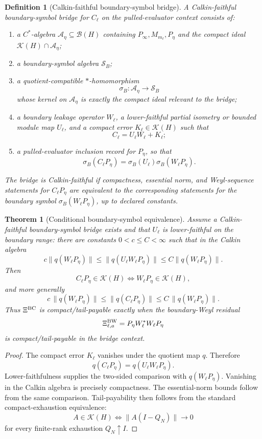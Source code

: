 \documentclass[11pt]{article}
\newtheorem{theorem}{Theorem}
\newtheorem{definition}{Definition}
\begin{document}
\begin{definition}[Calkin-faithful boundary-symbol bridge]
A Calkin-faithful boundary-symbol bridge for \(C_\ell\) on the pulled-evaluator
context consists of:
\begin{enumerate}[label=(\roman*)]
\item a \(C^*\)-algebra \(\mathcal A_\eta\subseteq\mathcal B(H)\) containing
\(P_\infty,M_{m_\ell},P_\eta\) and the compact ideal \(\mathcal K(H)\cap\mathcal A_\eta\);
\item a boundary-symbol algebra \(\mathcal S_B\);
\item a quotient-compatible \(*\)-homomorphism
\[
\sigma_B:\mathcal A_\eta\to\mathcal S_B
\]
whose kernel on \(\mathcal A_\eta\) is exactly the compact ideal relevant to the
bridge;
\item a boundary leakage operator \(W_\ell\), a lower-faithful partial isometry or
bounded module map \(U_\ell\), and a compact error \(K_\ell\in\mathcal K(H)\) such that
\[
C_\ell=U_\ell W_\ell+K_\ell;
\]
\item a pulled-evaluator inclusion record for \(P_\eta\), so that
\[
\sigma_B(C_\ell P_\eta)=\sigma_B(U_\ell)\sigma_B(W_\ell P_\eta).
\]
\end{enumerate}
The bridge is \emph{Calkin-faithful} if compactness, essential norm, and
Weyl-sequence statements for \(C_\ell P_\eta\) are equivalent to the corresponding
statements for the boundary symbol \(\sigma_B(W_\ell P_\eta)\), up to declared
constants.
\end{definition}

\begin{theorem}[Conditional boundary-symbol equivalence]
Assume a Calkin-faithful boundary-symbol bridge exists and that \(U_\ell\) is
lower-faithful on the boundary range: there are constants \(0<c\le C<\infty\)
such that in the Calkin algebra
\[
c\|q(W_\ell P_\eta)\|\le \|q(U_\ell W_\ell P_\eta)\|
\le C\|q(W_\ell P_\eta)\|.
\]
Then
\[
C_\ell P_\eta\in\mathcal K(H)
\iff
W_\ell P_\eta\in\mathcal K(H),
\]
and more generally
\[
c\,\|q(W_\ell P_\eta)\|
\le
\|q(C_\ell P_\eta)\|
\le
C\,\|q(W_\ell P_\eta)\|.
\]
Thus \(\Xi^{\rm BC}\) is compact/tail-payable exactly when the boundary-Weyl
residual
\[
\Xi^{\rm BW}_{\ell,a}=P_\eta W_\ell^*W_\ell P_\eta
\]
is compact/tail-payable in the bridge context.
\end{theorem}

\begin{proof}
The compact error \(K_\ell\) vanishes under the quotient map \(q\).  Therefore
\[
q(C_\ell P_\eta)=q(U_\ell W_\ell P_\eta).
\]
Lower-faithfulness supplies the two-sided comparison with \(q(W_\ell P_\eta)\).
Vanishing in the Calkin algebra is precisely compactness.  The essential-norm
bounds follow from the same comparison.  Tail-payability then follows from the
standard compact-exhaustion equivalence:
\[
A\in\mathcal K(H)
\iff
\|A(I-Q_N)\|\to0
\]
for every finite-rank exhaustion \(Q_N\uparrow I\).
\end{proof}
\end{document}
